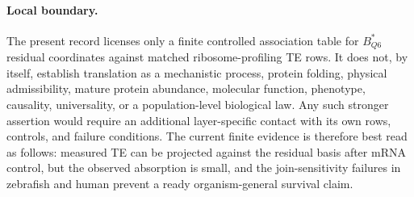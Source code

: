 \paragraph{Local boundary.}
The present record licenses only a finite controlled association table for $B^{*}_{Q6}$ residual coordinates against matched ribosome-profiling TE rows.  It does not, by itself, establish translation as a mechanistic process, protein folding, physical admissibility, mature protein abundance, molecular function, phenotype, causality, universality, or a population-level biological law.  Any such stronger assertion would require an additional layer-specific contact with its own rows, controls, and failure conditions.  The current finite evidence is therefore best read as follows: measured TE can be projected against the residual basis after mRNA control, but the observed absorption is small, and the join-sensitivity failures in zebrafish and human prevent a ready organism-general survival claim.

